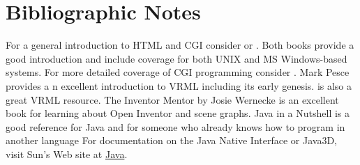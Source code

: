 \section{Bibliographic Notes}
\label{sec:ch11.bibliographic_notes}

For a general introduction to HTML and CGI consider \cite{Morris95} or \cite{Graham95}. Both books provide a good introduction and include coverage for both UNIX and MS Windows-based systems. For more detailed coverage of CGI programming consider \cite{Gundavaram96}. Mark Pesce \cite{Pesce95} provides a n excellent introduction to VRML including its early genesis. \cite{Ames96} is also a great VRML resource. The Inventor Mentor by Josie Wernecke \cite{Wernecke94} is an excellent book for learning about Open Inventor and scene graphs. Java in a Nutshell \cite{Flanagan96} is a good reference for Java and for someone who already knows how to program in another language For documentation on the Java Native Interface or Java3D, visit Sun's Web site at \href{https://www.java.com/en/}{Java}.


\printbibliography
